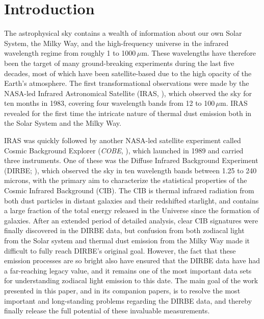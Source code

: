 \documentclass{aa}
\def\COBE{\textit{COBE}}
\begin{document}

   \maketitle

\setcounter{tocdepth}{2}
\tableofcontents
   
\section{Introduction}


The astrophysical sky contains a wealth of information about our own Solar System, the Milky Way, and the high-frequency universe in the infrared wavelength regime from roughly 1 to 1000\,$\mu$m. These wavelengths have therefore been the target of many ground-breaking experiments during the last five decades, most of which have been satellite-based due to the high opacity of the Earth's atmosphere. The first transformational observations were made by the NASA-led Infrared Astronomical Satellite (IRAS, \citealt{neugebauer:1984}), which observed the sky for ten months in 1983, covering four wavelength bands from 12 to 100$\,\mu$m. IRAS revealed for the first time the intricate nature of thermal dust emission both in the Solar System and the Milky Way.

IRAS was quickly followed by another NASA-led satellite experiment called Cosmic Background Explorer (\COBE, \citealt{boggess92}), which launched in 1989 and carried three instruments. One of these was the Diffuse Infrared Background Experiment (DIRBE; \citealp{hauser1998}), which observed the sky in ten wavelength bands between 1.25 to 240 microns, with the primary aim to characterize the statistical properties of the Cosmic Infrared Background (CIB). The CIB is thermal infrared radiation from both dust particles in distant galaxies and their redshifted starlight, and contains a large fraction of the total energy released in the Universe since the formation of galaxies. After an extended period of detailed analysis, clear CIB signatures were finally discovered in the DIRBE data, but confusion from both zodiacal light from the Solar system and thermal dust emission from the Milky Way made it difficult to fully reach DIRBE's original goal. However, the fact that these emission processes are so bright also have ensured that the DIRBE data have had a far-reaching legacy value, and it remains one of the most important data sets for understanding zodiacal light emission to this date. The main goal of the work presented in this paper, and in its companion papers, is to resolve the most important and long-standing problems regarding the DIRBE data, and thereby finally release the full potential of these invaluable measurements.
\end{document}
